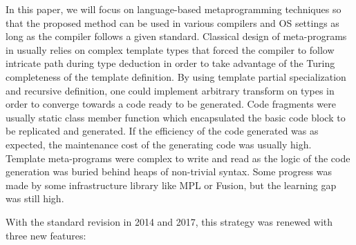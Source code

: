 \documentclass[../../main.tex]{subfiles}
\begin{document}
In this paper, we will focus on language-based metaprogramming
techniques so that the proposed method can
be used in various compilers and OS settings as long as the
compiler follows a given standard.
Classical design of meta-programs in \cpp usually relies
on complex template types that forced the compiler to follow
intricate path during type deduction in order to take advantage
of the Turing completeness of the template definition. By
using template partial specialization and recursive definition,
one could implement arbitrary transform on types in order
to converge towards a code ready to be generated. Code
fragments were usually static class member function which
encapsulated the basic code block to be replicated and
generated. If the efficiency of the code generated was as
expected, the maintenance cost of the generating code was
usually high. Template meta-programs were complex to write
and read as the logic of the code generation was buried
behind heaps of non-trivial syntax. Some progress was made
by some infrastructure library like MPL\cite{hpcs16} or Fusion, but
the learning gap was still high.

With the standard \cpp revision in 2014 and 2017, this
strategy was renewed with three new \cpp features:
\end{document}
